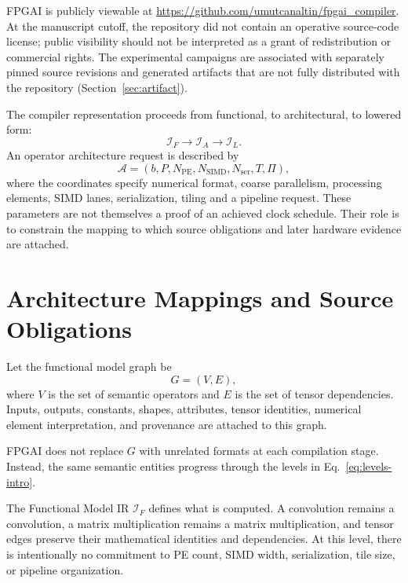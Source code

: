 \documentclass{article}
\begin{document}
FPGAI is publicly viewable at \url{https://github.com/umutcanaltin/fpgai_compiler}. At the manuscript cutoff, the repository did not contain an operative source-code license; public visibility should not be interpreted as a grant of redistribution or commercial rights. The experimental campaigns are associated with separately pinned source revisions and generated artifacts that are not fully distributed with the repository (Section~\ref{sec:artifact}).

The compiler representation proceeds from functional, to architectural, to lowered form:
\begin{equation}
\mathcal I_F\longrightarrow\mathcal I_A\longrightarrow\mathcal I_L.
\label{eq:levels-intro}
\end{equation}
An operator architecture request is described by
\begin{equation}
\mathcal A=(b,P,N_{\mathrm{PE}},N_{\mathrm{SIMD}},N_{\mathrm{ser}},T,\Pi),
\label{eq:architecture-vector}
\end{equation}
where the coordinates specify numerical format, coarse parallelism, processing elements, SIMD lanes, serialization, tiling and a pipeline request. These parameters are not themselves a proof of an achieved clock schedule. Their role is to constrain the mapping to which source obligations and later hardware evidence are attached.

\section{Architecture Mappings and Source Obligations}
\label{sec:model-ir}

Let the functional model graph be
\begin{equation}
G=(V,E),
\label{eq:model-graph}
\end{equation}
where $V$ is the set of semantic operators and $E$ is the set of tensor dependencies. Inputs, outputs, constants, shapes, attributes, tensor identities, numerical element interpretation, and provenance are attached to this graph.

FPGAI does not replace $G$ with unrelated formats at each compilation stage. Instead, the same semantic entities progress through the levels in Eq.~\ref{eq:levels-intro}.


The Functional Model IR $\mathcal{I}_{F}$ defines what is computed. A convolution remains a convolution, a matrix multiplication remains a matrix multiplication, and tensor edges preserve their mathematical identities and dependencies. At this level, there is intentionally no commitment to PE count, SIMD width, serialization, tile size, or pipeline organization.
\end{document}
